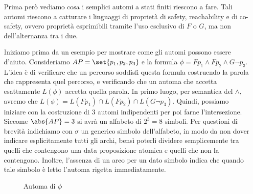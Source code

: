 Prima però vediamo cosa i semplici automi a stati finiti riescono a fare. Tali automi riescono a catturare i linguaggi di proprietà di safety, reachability e di co-safety, ovvero proprietà esprimibili tramite l'uso esclusivo di \(F\) o \(G\), ma non dell'alternanza tra i due.

Iniziamo prima da un esempio per mostrare come gli automi possono essere d'aiuto. Consideriamo \(AP = \set{p_1, p_2, p_3}\) e la formula \(\phi =  Fp_1 \land Fp_2 \land G \neg p_3\).
L'idea è di verificare che un percorso soddisfi questa formula costruendo la parola che rappresenta quel percorso, e verificando che un automa che accetta esattamente \(L(\phi)\) accetta quella parola. In primo luogo, per semantica del \(\land\), avremo che \(L(\phi) = L(Fp_1) \cap L(Fp_2) \cap L(G \neg p_3)\). Quindi, possiamo iniziare con la costruzione di \(3\) automi indipendenti per poi farne l'intersezione.
Siccome \(\abs{AP} = 3\) si avrà un alfabeto di \(2^3 = 8\) simboli. Per questioni di brevità indichiamo con \(\sigma\) un generico simbolo dell'alfabeto, in modo da non dover indicare esplicitamente tutti gli archi, bensì poterli dividere semplicemente tra quelli che contengono una data proposizione atomica e quelli che non la contengono. Inoltre, l'assenza di un arco per un dato simbolo indica che quando tale simbolo è letto l'automa rigetta immediatamente.

\begin{figure}[H]
  \centering
  \caption{Automa di \(\phi\)}\label{fig:formula_automata}
\end{figure}

